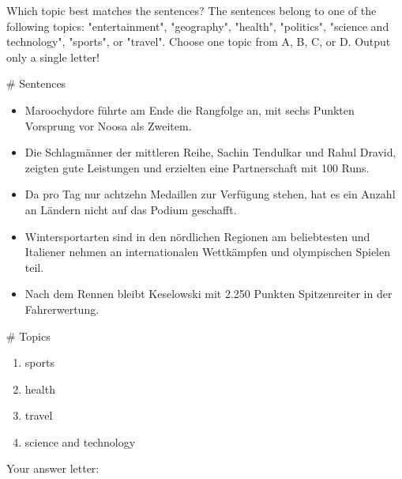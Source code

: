 \clearpage
\begin{figure*}[ht]
\begin{tcolorbox}[
    colback=white!95!black,    %
    colframe=black,            %
    title=Sentences-To-Topics (\stt), %
    fonttitle=\bfseries,       %
    boxrule=0.5pt,             %
    arc=4pt,                   %
    outer arc=4pt,
    width=\textwidth,          %
    before skip=1em,           %
    after skip=1em,            %
]

Which topic best matches the sentences? The sentences belong to one of the following topics: "entertainment", "geography", "health", "politics", "science and technology", "sports", or "travel". Choose one topic from A, B, C, or D. Output only a single letter!

\medskip

\# Sentences

\begin{itemize}[itemsep=0pt,topsep=2pt]
    \item \textasciigrave\textasciigrave\textasciigrave Maroochydore führte am Ende die Rangfolge an, mit sechs Punkten Vorsprung vor Noosa
 als Zweitem.\textasciigrave\textasciigrave\textasciigrave
    \item \textasciigrave\textasciigrave\textasciigrave 
    Die Schlagmänner der mittleren Reihe, Sachin Tendulkar und Rahul Dravid, zeigten gute Leistungen und erzielten eine Partnerschaft mit 100 Runs.
    \item \textasciigrave\textasciigrave\textasciigrave 
    Da pro Tag nur achtzehn Medaillen zur Verfügung stehen, hat es ein Anzahl an Ländern nicht auf das Podium geschafft.\textasciigrave\textasciigrave\textasciigrave 
    \item \textasciigrave\textasciigrave\textasciigrave 
    Wintersportarten sind in den nördlichen Regionen am beliebtesten und Italiener nehmen an internationalen Wettkämpfen und olympischen Spielen teil.\textasciigrave\textasciigrave\textasciigrave 
    \item \textasciigrave\textasciigrave\textasciigrave 
    Nach dem Rennen bleibt Keselowski mit 2.250 Punkten Spitzenreiter in der Fahrerwertung.\textasciigrave\textasciigrave\textasciigrave 
\end{itemize}

\medskip

\# Topics

\begin{enumerate}[label=\Alph*., itemsep=0pt, topsep=0pt]
    \item sports
    \item health
    \item travel
    \item science and technology
\end{enumerate}

\medskip

Your answer letter: 

\end{tcolorbox}
\end{figure*}
\clearpage
